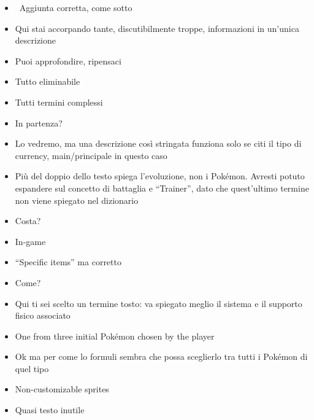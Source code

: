 {\begin{itemize}
  \item {} \rvBene\ Aggiunta corretta, come sotto
  \item {} Qui stai accorpando tante, discutibilmente troppe, informazioni in un'unica descrizione
  \item {} Puoi approfondire, ripensaci
  \item {} Tutto eliminabile
  \item {} Tutti termini complessi
  \item {} In partenza?
  \item {} Lo vedremo, ma una descrizione così stringata funziona solo se citi il tipo di currency, main/\allowbreak principale in questo caso
  \item {} Più del doppio dello testo spiega l'evoluzione, non i Pokémon. Avresti potuto espandere sul concetto di battaglia e ``Trainer'', dato che quest'ultimo termine non viene spiegato nel dizionario
  \item {} Costa?
  \item {} In-game
  \item {} ``Specific items'' ma corretto
  \item {} Come?
  \item {} Qui ti sei scelto un termine tosto: va spiegato meglio il sistema e il supporto fisico associato
  \item {} One from three initial Pokémon chosen by the player
  \item {} Ok ma per come lo formuli sembra che possa sceglierlo tra tutti i Pokémon di quel tipo
  \item {} Non-customizable sprites
  \item {} Quasi testo inutile

\end{itemize}}
